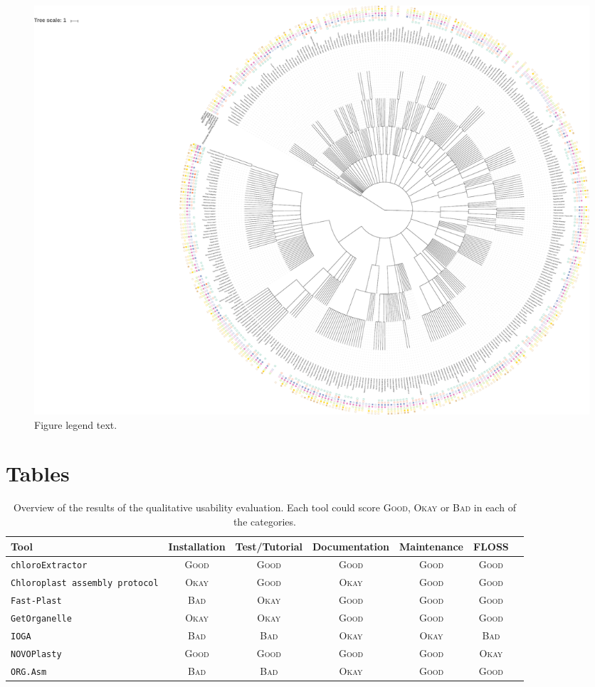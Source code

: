 \documentclass{bmcart}
\newcommand{\formatprogramnames}[1]{\texttt{#1}}
\newcommand{\ce}{\formatprogramnames{chloroExtractor}}
\newcommand{\oa}{\formatprogramnames{ORG.Asm}}
\newcommand{\fp}{\formatprogramnames{Fast-Plast}}
\newcommand{\ioga}{\formatprogramnames{IOGA}}
\newcommand{\np}{\formatprogramnames{NOVOPlasty}}
\newcommand{\go}{\formatprogramnames{GetOrganelle}}
\newcommand{\cassp}{\formatprogramnames{Chloroplast assembly protocol}}
\newcommand{\ok}{\textsc{Okay}}
\newcommand{\bad}{\textsc{Bad}}
\newcommand{\good}{\textsc{Good}}
\begin{document}
\begin{backmatter}
\begin{figure}[h!]
  \includegraphics[width=\textwidth]{plots/real_datasets_tree.pdf}
  \caption{
      Figure legend text.}
      \label{fig:tree}
      \end{figure}


\section*{Tables}
\begin{table}[]
    \centering
    \caption{Overview of the results of the qualitative usability evaluation. Each tool 
    could score \good{}, \ok{} or \bad{} in each of the categories.}
    \label{tab:resultsQual}
\begin{tabular}{p{3cm}cccccc}   
Tool & Installation & Test/Tutorial & Documentation & Maintenance & FLOSS\\                           \hline \ce{}     &  \good{}  &  \good{}  &  \good{}  &  \good{}  &  \good{} \\
\cassp{}  &  \ok{}    &  \good{}  &  \ok{}    &  \good{}  &  \good{} \\
\fp{}     &  \bad{}   &  \ok{}    &  \good{}  &  \good{}  &  \good{} \\
\go{}     &  \ok{}    &  \ok{}    &  \good{}  &  \good{}  &  \good{} \\
\ioga{}   &  \bad{}   &  \bad{}   &  \ok{}    &  \ok{}    &  \bad{}  \\
\np{}     &  \good{}  &  \good{}  &  \good{}  &  \good{}  &  \ok{}   \\
\oa{}     &  \bad{}   &  \bad{}   &  \ok{}    &  \good{}  &  \good{} \\ \hline
\end{tabular}      
\end{table}


\end{backmatter}
\end{document}
